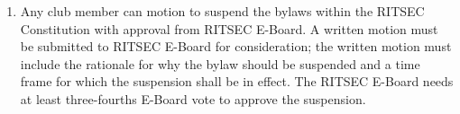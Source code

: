 

\begin{enumerate}
	\item Any club member can motion to suspend the bylaws within the RITSEC Constitution
	      with approval from RITSEC E-Board. A written motion must be submitted to RITSEC
	      E-Board for consideration; the written motion must include the rationale for
	      why the bylaw should be suspended and a time frame for which the suspension
	      shall be in effect. The RITSEC E-Board needs at least three-fourths E-Board
	      vote to approve the suspension.
\end{enumerate}